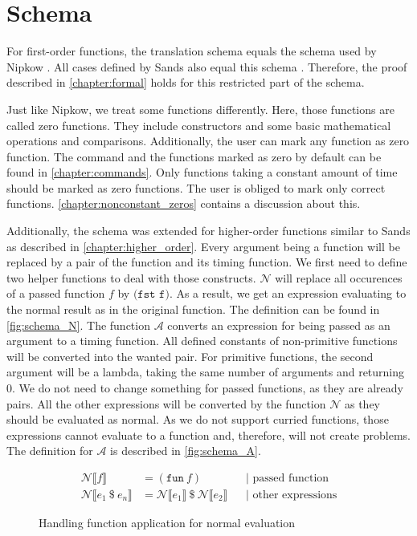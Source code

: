 
\section{Schema} \label{chapter:impl_schema}
For first-order functions, the translation schema equals the schema used by Nipkow \parencite{fds}.
All cases defined by Sands also equal this schema \parencite{sands}.
Therefore, the proof described in \autoref{chapter:formal} holds for this restricted part of the schema.

Just like Nipkow, we treat some functions differently.
Here, those functions are called zero functions.
They include constructors and some basic mathematical operations and comparisons.
Additionally, the user can mark any function as zero function.
The command and the functions marked as zero by default can be found in \autoref{chapter:commands}.
Only functions taking a constant amount of time should be marked as zero functions.
The user is obliged to mark only correct functions.
\autoref{chapter:nonconstant_zeros} contains a discussion about this.

Additionally, the schema was extended for higher-order functions similar to Sands as described in \autoref{chapter:higher_order}.
Every argument being a function will be replaced by a pair of the function and its timing function.
We first need to define two helper functions to deal with those constructs.
$\mathcal{N}$ will replace all occurences of a passed function $f$ by $\texttt{(fst f)}$.
As a result, we get an expression evaluating to the normal result as in the original function.
The definition can be found in \autoref{fig:schema_N}.
The function $\mathcal{A}$ converts an expression for being passed as an argument to a timing function.
All defined constants of non-primitive functions will be converted into the wanted pair.
For primitive functions, the second argument will be a lambda, taking the same number of arguments and returning $0$.
We do not need to change something for passed functions, as they are already pairs.
All the other expressions will be converted by the function $\mathcal{N}$ as they should be evaluated as normal.
As we do not support curried functions, those expressions cannot evaluate to a function and, therefore, will not create problems.
The definition for $\mathcal{A}$ is described in \autoref{fig:schema_A}.
\begin{figure}
\begin{align*}
  \mathcal{N}\llbracket f\rrbracket &= (\texttt{fun}\ f) &&\text{| passed function}\\
  \mathcal{N}\llbracket e_{1}\ \$\ e_{n}\rrbracket &= \mathcal{N}\llbracket e_{1}\rrbracket\ \$\ \mathcal{N}\llbracket e_{2}\rrbracket &&\text{| other expressions}
\end{align*}
\caption{Handling function application for normal evaluation}
\label{fig:schema_N}
\end{figure}

